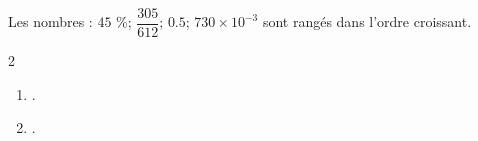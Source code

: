 \begin{exercice*}
    Les nombres : $45$ \%; $\dfrac{305}{612}$; $\num{0.5}$; $730\times 10^{-3}$ sont rangés dans l'ordre croissant.
\end{exercice*}
\begin{corrige}
    \phantom{rrr}    
    \begin{multicols}2
        \begin{enumerate}
            \item .
            \item .
        \end{enumerate}
    \end{multicols}
\end{corrige}

